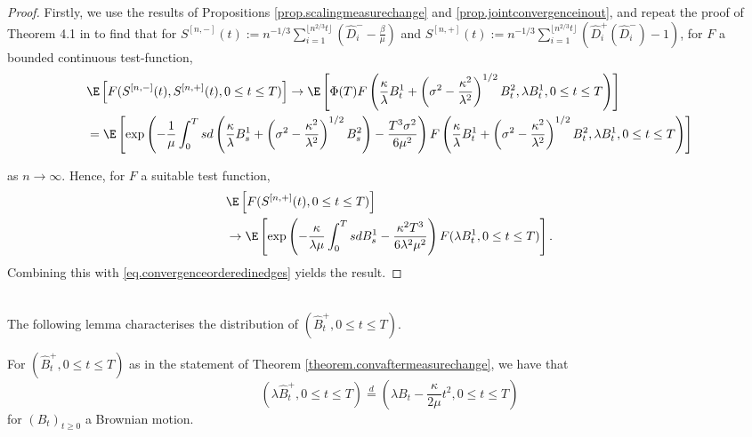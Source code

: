 \begin{proof}
 Firstly, we use the results of Propositions \ref{prop.scalingmeasurechange} and \ref{prop.jointconvergenceinout}, and repeat the proof of Theorem 4.1 in \cite{conchon--kerjanStableGraphMetric2020} to find that for ${S}^{[n,-]}(t):=n^{-1/3}\sum_{i=1}^{\lfloor n^{2/3}t\rfloor} \left(\hat{D}^-_i-\frac{\beta}{\mu}\right) $ and ${S}^{[n,+]}(t):=n^{-1/3}\sum_{i=1}^{\lfloor  n^{2/3}t \rfloor} \left(\hat{D}^+_i(\hat{D}^-_i)-1\right)$, for $F$ a bounded continuous test-function,
 \begin{align*}&\E\left[F({S}^{[n,-]}(t),{S}^{[n,+]}(t), 0\leq t \leq T ) \right] \to \E\left[\Phi(T) F\left(\frac{\kappa}{\lambda}B_t^1+\left(\sigma^2-\frac{\kappa^2}{\lambda^2}\right)^{1/2}B_t^2   ,\lambda B_t^1, 0\leq t \leq T\right)\right]\\
 &= \E\left[\exp\left(-\frac{1}{\mu}\int_0^Tsd\left(\frac{\kappa}{\lambda}B_s^1+\left(\sigma^2-\frac{\kappa^2}{\lambda^2}\right)^{1/2}B_s^2\right) - \frac{T^3 \sigma^2}{6\mu^2}\right) F\left(\frac{\kappa}{\lambda}B_t^1+\left(\sigma^2-\frac{\kappa^2}{\lambda^2}\right)^{1/2}B_t^2   ,\lambda B_t^1, 0\leq t \leq T\right)\right]\end{align*}
 
 as $n\to \infty$. Hence, for $F$ a suitable test function, 
 \begin{align*}&\E\left[F({S}^{[n,+]}(t), 0\leq t \leq T ) \right]\\&\to \E\left[\exp\left(-\frac{\kappa}{\lambda \mu} \int_0^T s dB^1_s -\frac{\kappa^2 T^3}{6\lambda^2 \mu^2}\right)F(\lambda B^1_t,   0\leq t \leq T)\right].\end{align*}
 Combining this with \eqref{eq.convergenceorderedinedges} yields the result.
 \end{proof}\\
 The following lemma characterises the distribution of $(\hat{B}^+_t, {0\leq t\leq T})$.
 \begin{lemma}\label{lemma.characterizelimitprocess}
 For $(\hat{B}^+_t, {0\leq t\leq T})$ as in the statement of Theorem \ref{theorem.convaftermeasurechange}, we have that 
 $$(\lambda \hat{B}^+_t, {0\leq t\leq T})\overset{d}{=}\left(\lambda B_t-\frac{\kappa}{2\mu}t^2, {0\leq t\leq T}\right)$$
 for $(B_t)_{t\geq 0}$ a Brownian motion.
 \end{lemma}
